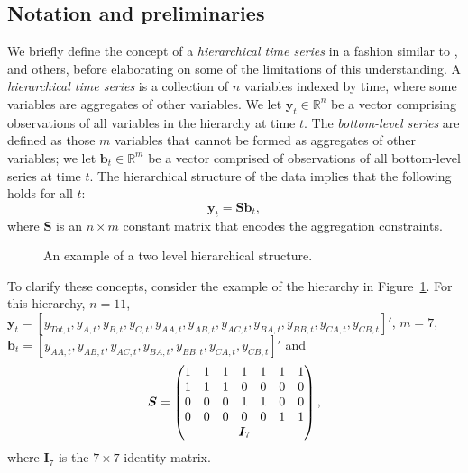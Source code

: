 \documentclass[12pt]{article}
\theoremstyle{definition}
\begin{document}
\subsection{Notation and preliminaries}\label{sec:notation}

We briefly define the concept of a \emph{hierarchical time series} in a fashion similar to \citet{AthEtAl2019_MacroBook}, \citet{FPP2018} and others, before elaborating on some of the limitations of this understanding. A \emph{hierarchical time series} is a collection of $n$ variables indexed by time, where some variables are aggregates of other variables. We let $\bm{y}_t \in \mathbb{R}^n$ be a vector comprising observations of all variables in the hierarchy at time $t$. The \emph{bottom-level series} are defined as those $m$ variables that cannot be formed as aggregates of other variables; we let $\bm{b}_t \in \mathbb{R}^m$ be a vector comprised of observations of all bottom-level series at time $t$. The hierarchical structure of the data implies that the following holds for all $t$:
\begin{equation*}
  \bm{y}_t = \bm{S}\bm{b}_t,
\end{equation*}
where $\bm{S}$ is an $n \times m$ constant matrix that encodes the aggregation constraints.

\begin{figure}[H]
	\begin{center}
		  
		 
		 
		\qobitree
	\end{center}
	\caption{An example of a two level hierarchical structure.}\label{fig:basichier}
\end{figure}

To clarify these concepts, consider the example of the hierarchy in Figure~\ref{fig:basichier}. For this hierarchy, $n=11$, $\bm{y}_t = [y_{Tot,t},y_{A,t}, y_{B,t},y_{C,t},y_{AA,t}, y_{AB,t}, y_{AC,t}, y_{BA,t}, y_{BB,t}, y_{CA,t}, y_{CB,t}]'$, $m=7$, $\bm{b}_t = [y_{AA,t}, y_{AB,t}, y_{AC,t}, y_{BA,t}, y_{BB,t}, y_{CA,t}, y_{CB,t}]'$ and
\[
  \bm{S} = \begin{pmatrix}
    1 & 1 & 1 & 1 & 1 & 1 & 1 \\
    1 & 1 & 1 & 0 & 0 & 0 & 0 \\
    0 & 0 & 0 & 1 & 1 & 0 & 0 \\
    0 & 0 & 0 & 0 & 0 & 1 & 1 \\
    & \multicolumn{5}{c}{\bm{I}_7} &
  \end{pmatrix},
\]
where $\bm{I}_7$ is the $7 \times 7$ identity matrix.
\end{document}
